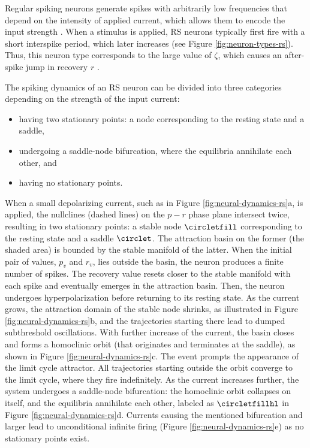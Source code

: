 Regular spiking neurons generate spikes with arbitrarily low frequencies that depend on the intensity of applied current, which allows them to encode the input strength \cite{IzhikevichBook2004:10}.
When a stimulus is applied, RS neurons typically first fire with a short interspike period, which later increases (see Figure \ref{fig:neuron-types-rs}). Thus, this neuron type corresponds to the large value of $\zeta$, which causes an after-spike jump in recovery $r$ \cite{Izhikevich2003}.

The spiking dynamics of an RS neuron can be divided into three categories depending on the strength of the input current:
\begin{itemize}
    \item having two stationary points: a node corresponding to the resting state and a saddle,
    \item undergoing a saddle-node bifurcation, where the equilibria annihilate each other, and
    \item having no stationary points.
\end{itemize}

When a small depolarizing current, such as in Figure \ref{fig:neural-dynamics-rs}a, is applied, the nullclines (dashed lines) on the $p-r$ phase plane intersect twice, resulting in two stationary points: a stable node $\circletfill$ corresponding to the resting state and a saddle $\circlet$. The attraction basin on the former (the shaded area) is bounded by the stable manifold of the latter. When the initial pair of values, $p_v$ and $r_v$, lies outside the basin, the neuron produces a finite number of spikes. The recovery value resets closer to the stable manifold with each spike and eventually emerges in the attraction basin. Then, the neuron undergoes hyperpolarization before returning to its resting state. As the current grows, the attraction domain of the stable node shrinks, as illustrated in Figure \ref{fig:neural-dynamics-rs}b, and the trajectories starting there lead to dumped subthreshold oscillations. With further increase of the current, the basin closes and forms a homoclinic orbit (that originates and terminates at the saddle), as shown in Figure \ref{fig:neural-dynamics-rs}c. The event prompts the appearance of the limit cycle attractor. All trajectories starting outside the orbit converge to the limit cycle, where they fire indefinitely. As the current increases further, the system undergoes a saddle-node bifurcation: the homoclinic orbit collapses on itself, and the equilibria annihilate each other, labeled as $\circletfillhl$ in Figure \ref{fig:neural-dynamics-rs}d. Currents causing the mentioned bifurcation and larger lead to unconditional infinite firing (Figure \ref{fig:neural-dynamics-rs}e) as no stationary points exist.


